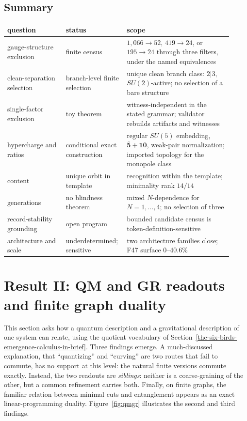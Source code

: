\documentclass[11pt]{article}
\theoremstyle{definition}
\begin{document}
\subsection{Summary}\label{result-sm-summary-table}

\begin{center}
\small
\begin{longtable}[]{@{}p{0.25\linewidth}p{0.22\linewidth}p{0.45\linewidth}@{}}
\toprule
question & status & scope\\
\midrule
\endhead
gauge-structure exclusion & finite census & \(1{,}066\to52\), \(419\to24\), or \(195\to24\) through three filters, under
the named equivalences\\
clean-separation selection & branch-level finite selection & unique clean branch class: \(2|3\), \(SU(2)\)-active; no
selection of a bare structure\\
single-factor exclusion & toy theorem & witness-independent in the stated grammar; validator rebuilds artifacts and
witnesses\\
hypercharge and ratios & conditional exact construction & regular \(SU(5)\) embedding,
\(\overline{\mathbf5}+\mathbf{10}\), weak-pair normalization; imported topology for the monopole class\\
content & unique orbit in template & recognition within the template; minimality rank \(14/14\)\\
generations & no blindness theorem & mixed \(N\)-dependence for \(N=1,\dots,4\); no selection of three\\
record-stability grounding & open program & bounded candidate census is token-definition-sensitive\\
architecture and scale & underdetermined; sensitive & two architecture families close; F47 surface \(0\)--\(40.6\%\)\\
\bottomrule
\end{longtable}
\end{center}
 \section{Result II: QM and GR readouts and finite graph duality}\label{result-ii-quantum-mechanics-general-relativity-as-a-common-refinement-a-unification}

This section asks how a quantum description and a gravitational description of one system can relate, using the
quotient vocabulary of Section~\ref{the-six-birds-emergence-calculus-in-brief}. Three findings emerge. A
much-discussed explanation, that ``quantizing'' and ``curving'' are two routes that fail to commute, has no support at
this level: the natural finite versions commute exactly. Instead, the two readouts are \emph{siblings}: neither is a
coarse-graining of the other, but a common refinement carries both. Finally, on finite graphs, the familiar relation
between minimal cuts and entanglement appears as an exact linear-programming duality. Figure~\ref{fig:qmgr} illustrates
the second and third findings.
\end{document}
